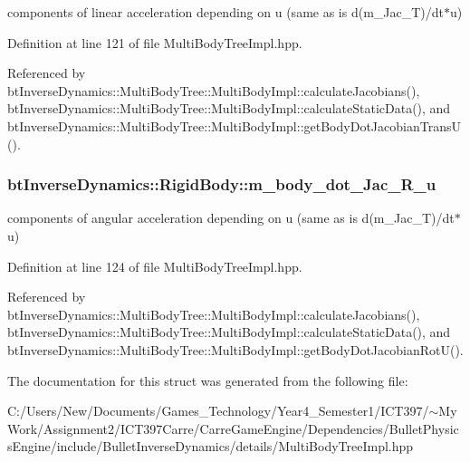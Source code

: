 components of linear acceleration depending on u (same as is d(m\_\-Jac\_\-T)/dt$\ast$u) 

Definition at line 121 of file MultiBodyTreeImpl.hpp.

Referenced by btInverseDynamics::MultiBodyTree::MultiBodyImpl::calculateJacobians(), btInverseDynamics::MultiBodyTree::MultiBodyImpl::calculateStaticData(), and btInverseDynamics::MultiBodyTree::MultiBodyImpl::getBodyDotJacobianTransU().\hypertarget{structbt_inverse_dynamics_1_1_rigid_body_aabe7b9e48f3eb97fdfe8f764beb919f}{
\subsubsection[m\_\-body\_\-dot\_\-Jac\_\-R\_\-u]{ {\bf btInverseDynamics::RigidBody::m\_\-body\_\-dot\_\-Jac\_\-R\_\-u}}}
\label{structbt_inverse_dynamics_1_1_rigid_body_aabe7b9e48f3eb97fdfe8f764beb919f}


components of angular acceleration depending on u (same as is d(m\_\-Jac\_\-T)/dt$\ast$u) 

Definition at line 124 of file MultiBodyTreeImpl.hpp.

Referenced by btInverseDynamics::MultiBodyTree::MultiBodyImpl::calculateJacobians(), btInverseDynamics::MultiBodyTree::MultiBodyImpl::calculateStaticData(), and btInverseDynamics::MultiBodyTree::MultiBodyImpl::getBodyDotJacobianRotU().

The documentation for this struct was generated from the following file:\begin{CompactItemize}
\item 
C:/Users/New/Documents/Games\_\-Technology/Year4\_\-Semester1/ICT397/$\sim$My Work/Assignment2/ICT397Carre/CarreGameEngine/Dependencies/BulletPhysicsEngine/include/BulletInverseDynamics/details/MultiBodyTreeImpl.hpp\end{CompactItemize}
